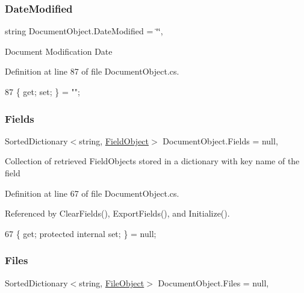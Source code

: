 \subsubsection{\texorpdfstring{Date\+Modified}{DateModified}}
{\footnotesize\ttfamily string Document\+Object.\+Date\+Modified = \char`\"{}\char`\"{}\hspace{0.3cm}{\ttfamily [get]}, {\ttfamily [set]}}



Document Modification Date 



Definition at line 87 of file Document\+Object.\+cs.


\begin{DoxyCode}
87 \{ \textcolor{keyword}{get}; \textcolor{keyword}{set}; \} = \textcolor{stringliteral}{""};
\end{DoxyCode}
\mbox{\label{class_document_object_ae203b8a3e40b6c428145d2335b71245c}} 
\subsubsection{\texorpdfstring{Fields}{Fields}}
{\footnotesize\ttfamily Sorted\+Dictionary$<$string, \mbox{\hyperlink{class_field_object}{Field\+Object}}$>$ Document\+Object.\+Fields = null\hspace{0.3cm}{\ttfamily [get]}, {\ttfamily [set]}}



Collection of retrieved Field\+Objects stored in a dictionary with key name of the field 



Definition at line 67 of file Document\+Object.\+cs.



Referenced by Clear\+Fields(), Export\+Fields(), and Initialize().


\begin{DoxyCode}
67 \{ \textcolor{keyword}{get}; \textcolor{keyword}{protected} \textcolor{keyword}{internal} \textcolor{keyword}{set}; \} = null;
\end{DoxyCode}
\mbox{\label{class_document_object_afe6bcf5175607f91dde768491f23a0a4}} 
\subsubsection{\texorpdfstring{Files}{Files}}
{\footnotesize\ttfamily Sorted\+Dictionary$<$string, \mbox{\hyperlink{class_file_object}{File\+Object}}$>$ Document\+Object.\+Files = null\hspace{0.3cm}{\ttfamily [get]}, {\ttfamily [set]}}



